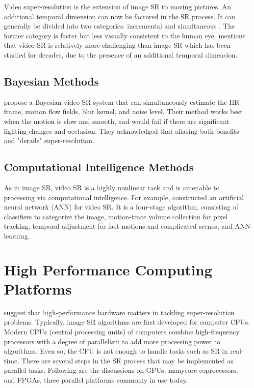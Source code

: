 Video super-resolution is the extension of image SR to moving pictures.
An additional temporal dimension can now be factored in the SR process.
It can generally be divided into two categories: incremental and simultaneous \citep{Su2011}.
The former category is faster but less visually consistent to the human eye.
\cite{Liu2014} mentions that video SR is relatively more challenging than image SR which has been studied for decades, due to the presence of an additional temporal dimension.


\subsection{Bayesian Methods}

\cite{Liu2014} propose a Bayesian video SR system that can simultaneously estimate the HR frame, motion flow fields, blur kernel, and noise level.
Their method works best when the motion is slow and smooth, and would fail if there are significant lighting changes and occlusion.
They acknowledged that aliasing both benefits and "derails" super-resolution.


\subsection{Computational Intelligence Methods}
As in image SR, video SR is a highly nonlinear task and is amenable to processing via computational intelligence. 
For example, \cite{Cheng2013} constructed an artificial neural network (ANN) for video SR.
It is a four-stage algorithm, consisting of classifiers to categorize the image, motion-trace volume collection for pixel tracking, temporal adjustment for fast motions and complicated scenes, and ANN learning.

\section{High Performance Computing Platforms}
\cite{Yang2010a} suggest that high-performance hardware matters in tackling super-resolution problems. 
Typically, image SR algorithms are first developed for computer CPUs.
Modern CPUs (central processing units) of computers combine high-frequency processors with a degree of parallelism to add more processing power to algorithms.
Even so, the CPU is not enough to handle tasks such as SR in real-time.
There are several steps in the SR process that may be implemented as parallel tasks.
Following are the discussions on GPUs, manycore coprocessors, and FPGAs, three parallel platforms commonly in use today.

